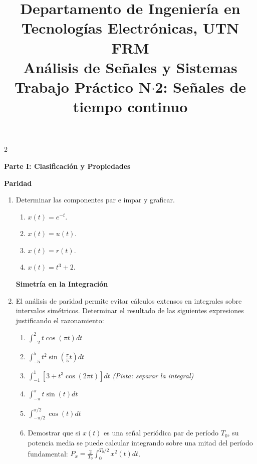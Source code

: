 \documentclass[10pt,a4paper]{article}
\title{%
	{\normalsize Departamento de Ingeniería en Tecnologías Electrónicas, UTN FRM}\\[0.1cm]
	{\large Análisis de Señales y Sistemas}\\[0.15cm]
	{\normalsize Trabajo Práctico N$^{\text o}$2: Señales de tiempo continuo}%
}
\author{}
\date{}
\begin{document}
	\maketitle
	\thispagestyle{fancy}

	\begin{multicols}{2}

		\label{sec:enun}

		\vspace{0.2em}
		\begin{center}
			\textbf{\large Parte I: Clasificación y Propiedades}
		\end{center}
		\vspace{-0.5em}

		\textbf{Paridad}
		\begin{enumerate}
			\item {Determinar las componentes par e impar y graficar. }
			\begin{enumerate}
				\item $x(t)=e^{-t}$.
				\item $x(t)= u(t)$.
				\item $x(t)= r(t)$.
				\item $x(t)= t^3+2$.
			\end{enumerate}

            \textbf{Simetría en la Integración}
            \item El análisis de paridad permite evitar cálculos extensos en integrales sobre intervalos simétricos. Determinar el resultado de las siguientes expresiones justificando el razonamiento:
            \begin{enumerate}
                \item $\int_{-2}^{2} t \cos(\pi t) dt$
                \item $\int_{-5}^{5} t^2 \sin\left(\frac{\pi}{5} t\right) dt$
                \item $\int_{-1}^{1} \left[ 3 + t^3 \cos(2\pi t) \right] dt$ \quad \textit{(Pista: separar la integral)}
                \item $\int_{-\pi}^{\pi} t \sin(t) dt$
                \item $\int_{-\pi/2}^{\pi/2} \cos(t) dt$
                \item Demostrar que si $x(t)$ es una señal periódica par de período $T_0$, su potencia media se puede calcular integrando sobre una mitad del período fundamental: $P_x = \frac{2}{T_0} \int_{0}^{T_0/2} x^2(t) dt$.
            \end{enumerate}


\end{enumerate}
\end{multicols}
\end{document}
